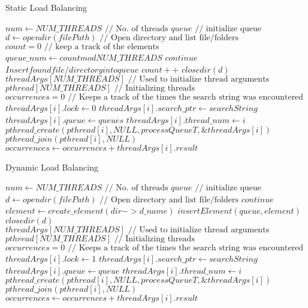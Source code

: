 \documentclass{article}
\begin{document}
\begin{algorithm}
\caption{Static Load Balancing}\label{euclid}
\begin{algorithmic}[1]
\STATE $num \gets NUM\_THREADS \text{ // No. of threads}$
\STATE $queue \text{ // initialize queue }$
\STATE $d \gets opendir(filePath) \text{ // Open directory and list file/folders}$
\STATE $count = 0 \text{ // keep a track of the elements}$
        \STATE $queue\_num \gets count mod NUM\_THREADS$
            \STATE $continue$
        \ENDIF
        \STATE $Insert found file/directory into queue$
        \STATE $count++$
    \ENDWHILE
    \STATE $closedir(d)$
\ENDIF
\STATE $threadArgs[NUM\_THREADS] \text{ // Used to initialize thread arguments}$
\STATE $pthread[NUM\_THREADS] \text{ // Initializing threads}$
\STATE $occurrences = 0 \text{ // Keeps a track of the times the search string was encountered}$
    \STATE $threadArgs[i].lock \gets 0$
    \STATE $threadArgs[i].search\_ptr \gets searchString$
    \STATE $threadArgs[i].queue \gets queues$
    \STATE $threadArgs[i].thread\_num \gets i$
    \STATE ${pthread\_create(pthread[i], NULL, processQueueT, \&threadArgs[i])}$
\ENDFOR
{}
    \STATE ${pthread\_join(pthread[i], NULL)}$
    \STATE $occurrences \gets occurrences + threadArgs[i].result$
\ENDFOR
\STATE {}
\end{algorithmic}
\end{algorithm}

\begin{algorithm}
\caption{Dynamic Load Balancing}\label{euclid}
\begin{algorithmic}[1]
\STATE $num \gets NUM\_THREADS \text{ // No. of threads}$
\STATE $queue \text{ // initialize queue}$ 
\STATE $d \gets opendir(filePath) \text{ // Open directory and list file/folders}$
            \STATE $continue$
        \ENDIF
        \STATE $element \gets create\_element(dir->d\_name)$
        \STATE $insertElement(queue, element)$
    \ENDWHILE
    \STATE $closedir(d)$
\ENDIF
\STATE $threadArgs[NUM\_THREADS] \text{ // Used to initialize thread arguments}$
\STATE $pthread[NUM\_THREADS] \text{ // Initializing threads}$
\STATE $occurrences = 0 \text{ // Keeps a track of the times the search string was encountered}$
    \STATE $threadArgs[i].lock \gets 1$
    \STATE $threadArgs[i].search\_ptr \gets searchString$
    \STATE $threadArgs[i].queue \gets queue$
    \STATE $threadArgs[i].thread\_num \gets i$
    \STATE ${pthread\_create(pthread[i], NULL, processQueueT, \&threadArgs[i])}$
\ENDFOR
{}
    \STATE ${pthread\_join(pthread[i], NULL)}$
    \STATE $occurrences \gets occurrences + threadArgs[i].result$
\ENDFOR
\STATE {}
\end{algorithmic}
\end{algorithm}
\end{document}
